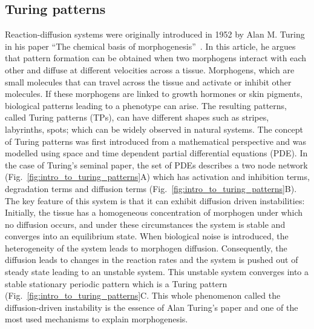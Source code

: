 \subsection{Turing patterns}
Reaction-diffusion systems were originally introduced in 1952 by Alan M. Turing in his paper “The chemical basis of morphogenesis”~\parencite{Turing1952}.
In this article, he argues that pattern formation can be obtained when two morphogens interact with each other and diffuse at different
velocities across a tissue.
Morphogens, which are small molecules that can travel across the tissue and activate or inhibit other molecules.
If these morphogens are linked to growth hormones or skin pigments, biological patterns leading to a phenotype can arise.
The resulting patterns, called Turing patterns (TPs), can have different shapes such as stripes, labyrinths, spots; which can be widely observed in natural systems.
The concept of Turing patterns was first introduced from a mathematical perspective and was modelled using space and time dependent partial differential equations (PDE). In the case of Turing’s seminal paper, the set of PDEs describes a two node network (Fig.~\ref{fig:intro_to_turing_patterns}A) which has activation and inhibition terms, degradation terms and diffusion terms (Fig.~\ref{fig:intro_to_turing_patterns}B).
The key feature of this system is that it can exhibit diffusion driven instabilities: Initially, the tissue has a homogeneous concentration of morphogen under which no diffusion occurs, and under these circumstances the system is stable and converges into an equilibrium state.
When biological noise is introduced, the heterogeneity of the system leads to morphogen diffusion.
Consequently, the diffusion leads to changes in the reaction rates and the system is pushed out of steady state leading to an unstable system.
This unstable system converges into a stable stationary periodic pattern which is a Turing pattern (Fig.~\ref{fig:intro_to_turing_patterns}C.
This whole phenomenon called the diffusion-driven instability is the essence of Alan Turing’s paper and one of the most used mechanisms to explain morphogenesis.

